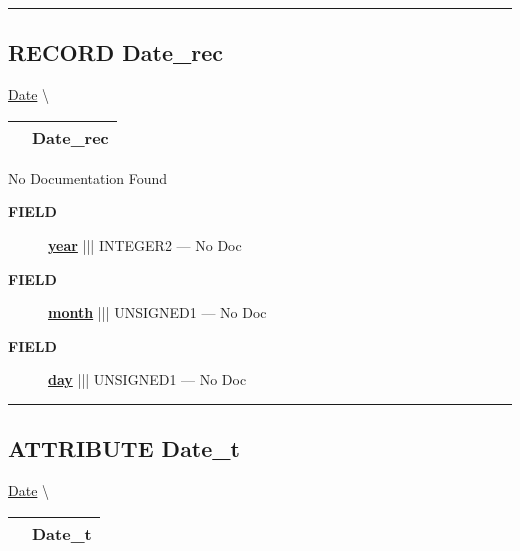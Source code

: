\rule{\linewidth}{0.5pt}

\subsection*{\textsf{\colorbox{headtoc}{\color{white} RECORD}
Date\_rec}}

\hypertarget{ecldoc:date.date_rec}{}
\hspace{0pt} \hyperlink{ecldoc:Date}{Date} \textbackslash 

{\renewcommand{\arraystretch}{1.5}
\begin{tabularx}{\textwidth}{|>{\raggedright\arraybackslash}l|X|}
\hline
\hspace{0pt}\mytexttt{\color{red} } & \textbf{Date\_rec} \\
\hline
\end{tabularx}
}

\par





No Documentation Found







\par
\begin{description}
\item [\colorbox{tagtype}{\color{white} \textbf{\textsf{FIELD}}}] \textbf{\underline{year}} ||| INTEGER2 --- No Doc
\item [\colorbox{tagtype}{\color{white} \textbf{\textsf{FIELD}}}] \textbf{\underline{month}} ||| UNSIGNED1 --- No Doc
\item [\colorbox{tagtype}{\color{white} \textbf{\textsf{FIELD}}}] \textbf{\underline{day}} ||| UNSIGNED1 --- No Doc
\end{description}





\rule{\linewidth}{0.5pt}
\subsection*{\textsf{\colorbox{headtoc}{\color{white} ATTRIBUTE}
Date\_t}}

\hypertarget{ecldoc:date.date_t}{}
\hspace{0pt} \hyperlink{ecldoc:Date}{Date} \textbackslash 

{\renewcommand{\arraystretch}{1.5}
\begin{tabularx}{\textwidth}{|>{\raggedright\arraybackslash}l|X|}
\hline
\hspace{0pt}\mytexttt{\color{red} } & \textbf{Date\_t} \\
\hline
\end{tabularx}
}

